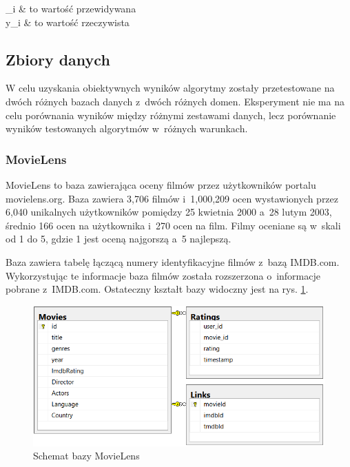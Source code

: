 \documentclass[twoside]{iisthesis}
\begin{document}
		\begin{conditions*}
			_i & to wartość przewidywana \\
			y_i  &  to wartość rzeczywista
		\end{conditions*} 
	
	
		\subsection{Zbiory danych}
		
		W celu uzyskania obiektywnych wyników algorytmy zostały przetestowane na dwóch różnych bazach danych z~dwóch różnych domen. Eksperyment nie ma na celu porównania wyników między różnymi zestawami danych, lecz porównanie wyników testowanych algorytmów w~różnych warunkach. 
		
		\subsubsection{MovieLens}
		MovieLens \cite{harper2016movielens} to baza zawierająca oceny filmów przez użytkowników portalu movielens.org. Baza zawiera 3,706 filmów i~1,000,209 ocen wystawionych przez 6,040 unikalnych użytkowników pomiędzy 25 kwietnia 2000 a~28 lutym 2003, średnio 166 ocen na użytkownika i~270 ocen na film. Filmy oceniane są w~skali od 1 do 5, gdzie 1 jest oceną najgorszą a~5 najlepszą. 
		
		Baza zawiera tabelę łączącą numery identyfikacyjne filmów z~bazą IMDB.com. Wykorzystując te informacje baza filmów została rozszerzona o~informacje pobrane z~IMDB.com. Ostateczny kształt bazy widoczny jest na rys. \ref{fig:movielens_schema}.
		
			\begin{figure}[!ht] 
				\centering
				\includegraphics[width=1\textwidth]{movielens}
				\caption{Schemat bazy MovieLens}
				\label{fig:movielens_schema}
			\end{figure}
		
\end{document}
